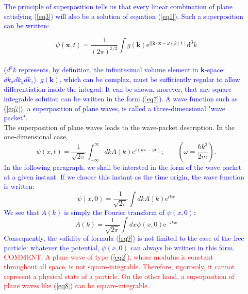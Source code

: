 \documentclass{article}
\begin{document}
\textcolor{blue}{The principle of superposition tells us that every linear combination of plane satisfying (\ref{eq3}) will also be a solution of equation (\ref{eq1}). Such a superposition can be written: }

\begin{equation}
    \psi(\mathbf{x}, t)=\frac{1}{(2 \pi)^{3 / 2}} \int g(\mathbf{k}) \mathrm{e}^{i[\mathbf{k} \cdot \mathbf{x}-\omega(k) t \mid} \mathrm{d}^{3} k
    \label{eq7}
\end{equation}
\\
\textcolor{blue}{($d^{3}k$ represents, by definition, the infinitesimal volume element in \textbf{k}-space: $dk_x dk_y dk_z$). $g(\textbf{k})$, which can be complex, must be sufficiently regular to allow differentiation inside the integral. It can be shown, morever, that any square-integrable solution can be written in the form (\ref{eq7}). A wave function such as (\ref{eq7}), a superposition of plane waves, is called a three-dimensional "wave packet".} 
\\

The superposition of plane waves leads to the wave-packet description. In the one-dimensional case,
\begin{equation}
    \psi(x, t)=\frac{1}{\sqrt{2 \pi}} \int_{-\infty}^{\infty} d k A(k) e^{i(k x-\omega t)}; \qquad \left(\omega=\frac{\hbar k^{2}}{2 m}\right).
    \label{eq8}
\end{equation}
\textcolor{blue}{In the following paragraph, we shall be intersted in the form of the wave packet at a given instant. If we choose this instant as the time origin, the wave function is written:}
\begin{equation}
    \psi(x, 0)=\frac{1}{\sqrt{2 \pi}} \int dk A(k) \mathrm{e}^{i k x}
    \label{eq9}
\end{equation}
\textcolor{blue}{We see that $A(k)$ is simply the Fourier transform of $\psi(x,0)$:}
\begin{equation}
    A(k)=\frac{1}{\sqrt{2 \pi}} \int dx \psi(x, 0) \mathrm{e}^{-i k x}
\end{equation}
\textcolor{blue}{Consequently, the validity of formula (\ref{eq9}) is not limited to the case of the free particle: whatever the potential, $\psi(x,0)$ can always be written in this form.}
\\

\textcolor{red}{COMMENT: A plane wave of type (\ref{eq2}), whose modulus is constant throughout all space, is not square-integrable. Therefore, rigorosoly, it cannot represent a physical state of a particle. On the other hand, a superposition of plane waves like (\ref{eq8}) can be square-integrable.}
\\
\end{document}
